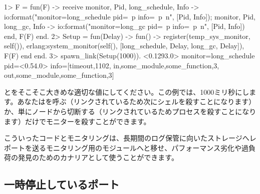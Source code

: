 \begin{VerbatimEshell}
1> F = fun(F) ->
    receive
        {monitor, Pid, long_schedule, Info} ->
            io:format("monitor=long_schedule pid=~p info=~p~n", [Pid, Info]);
        {monitor, Pid, long_gc, Info} -> 
            io:format("monitor=long_gc pid=~p info=~p~n", [Pid, Info])
    end,
    F(F)
end.
2> Setup = fun(Delay) -> fun() -> 
     register(temp_sys_monitor, self()),
     erlang:system_monitor(self(), [{long_schedule, Delay}, {long_gc, Delay}]),
     F(F)
end end.
3> spawn_link(Setup(1000)).
<0.1293.0>
monitor=long_schedule pid=<0.54.0> info=[{timeout,1102},
                                         {in,{some_module,some_function,3}},
                                         {out,{some_module,some_function,3}}]
\end{VerbatimEshell}

とをそこそこ大きめな適切な値にしてください。この例では、1000ミリ秒にします。あなたはを呼ぶ（リンクされているため次にシェルを殺すことになります）か、単にノードから切断する（リンクされているためプロセスを殺すことになります）だけでモニターを殺すことができます。

こういったコードとモニタリングは、長期間のログ保管に向いたストレージへレポートを送るモニタリング用のモジュールへと移せ、パフォーマンス劣化や過負荷の発見のためのカナリアとして使うことができます。

\subsection{一時停止しているポート}
\label{subsec:port-system-monitors}

